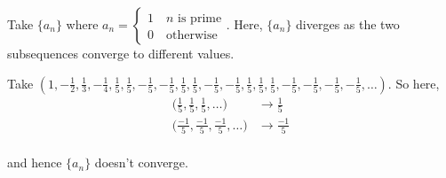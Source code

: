 \begin{eg}
    Take $\{a_n\} $ where $a_n = \begin{cases} 1 \quad \text{$n$ is prime} \\ 0 \quad \text{otherwise}\end{cases}$. Here, $\{a_n\} $ diverges as the two subsequences converge to different values.
\end{eg}

\begin{eg}
Take $(1, -\frac{1}{2}, \frac{1}{3}, -\frac{1}{4}, \frac{1}{5}, \frac{1}{5}, -\frac{1}{5}, -\frac{1}{5}, \frac{1}{5}, \frac{1}{5}, -\frac{1}{5}, -\frac{1}{5}, \frac{1}{5}, \frac{1}{5}, \frac{1}{5}, -\frac{1}{5}, -\frac{1}{5}, -\frac{1}{5}, -\frac{1}{5}, \dots)$. So here, 
\begin{align*}
    \bigg (\frac{1}{5}, \frac{1}{5}, \frac{1}{5}, \dots \bigg) &\to \frac{1}{5}\\
    \bigg (\frac{-1}{5}, \frac{-1}{5}, \frac{-1}{5}, \dots \bigg) &\to \frac{-1}{5}\\
\end{align*}

and hence $\{a_n\}$ doesn't converge.
\end{eg}


